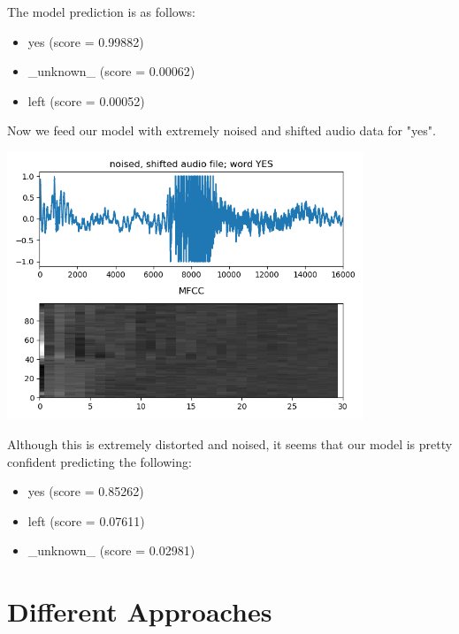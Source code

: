 \documentclass[twoside]{article}
\newenvironment{Figure}
  {\par\medskip\noindent\minipage{\linewidth}}
  {\endminipage\par\medskip}
\begin{document}
\begin{multicols}{2}
The model prediction is as follows:
\begin{itemize}
	\item yes (score = 0.99882)
	\item \_unknown\_ (score = 0.00062)
	\item left (score = 0.00052)
\end{itemize}

Now we feed our model with extremely noised and shifted audio data for "yes". 
\begin{Figure}
	\centering
	\includegraphics[width=0.8\textwidth]{yes_noised}
	\label{img:yes-noised}
\end{Figure}

Although this is extremely distorted and noised, it seems that our model is pretty confident predicting the following:
\begin{itemize}
	\item yes (score = 0.85262)
	\item left (score = 0.07611)
	\item \_unknown\_ (score = 0.02981)
\end{itemize}




\section{Different Approaches}






\end{multicols}
\end{document}
